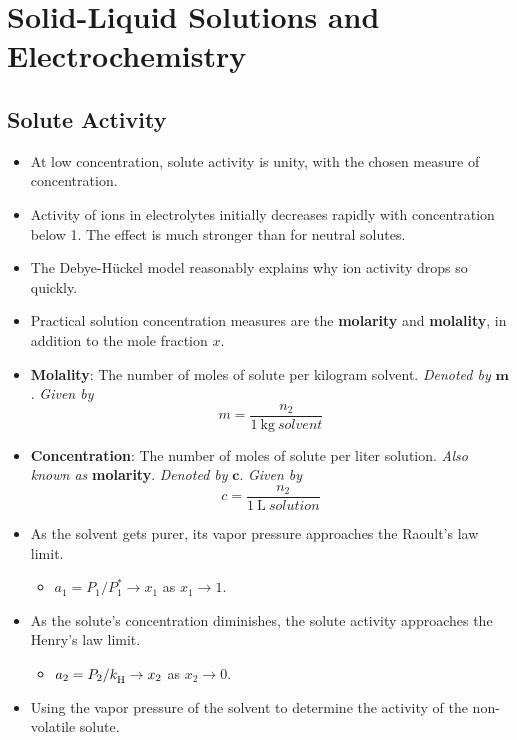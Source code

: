 \documentclass[../notes.tex]{subfiles}
\begin{document}
\chapter{Solid-Liquid Solutions and Electrochemistry}
\section{Solute Activity}
\begin{itemize}
    \item {}At low concentration, solute activity is unity, with the chosen measure of concentration.
    \item Activity of ions in electrolytes initially decreases rapidly with concentration below \SI{1}{\molar}. The effect is much stronger than for neutral solutes.
    \item The Debye-H\"{u}ckel model reasonably explains why ion activity drops so quickly.
    \item Practical solution concentration measures are the \textbf{molarity} and \textbf{molality}, in addition to the mole fraction $x$.
    \item \textbf{Molality}: The number of moles of solute per kilogram solvent. \emph{Denoted by} $\bm{m}$. \emph{Given by}
    \begin{equation*}
        m = \frac{n_2}{\SI{1}{\kilo\gram\ solvent}}
    \end{equation*}
    \item \textbf{Concentration}: The number of moles of solute per liter solution. \emph{Also known as} \textbf{molarity}. \emph{Denoted by} $\bm{c}$. \emph{Given by}
    \begin{equation*}
        c = \frac{n_2}{\SI{1}{\liter\ solution}}
    \end{equation*}
    \item As the solvent gets purer, its vapor pressure approaches the Raoult's law limit.
    \begin{itemize}
        \item $a_1=P_1/P_1^*\to x_1$ as $x_1\to 1$.
    \end{itemize}
    \item As the solute's concentration diminishes, the solute activity approaches the Henry's law limit.
    \begin{itemize}
        \item $a_2=P_2/{k_\text{H}^{}}\to x_2$ as $x_2\to 0$.
    \end{itemize}
    \item Using the vapor pressure of the solvent to determine the activity of the non-volatile solute.

\end{itemize}
\end{document}
